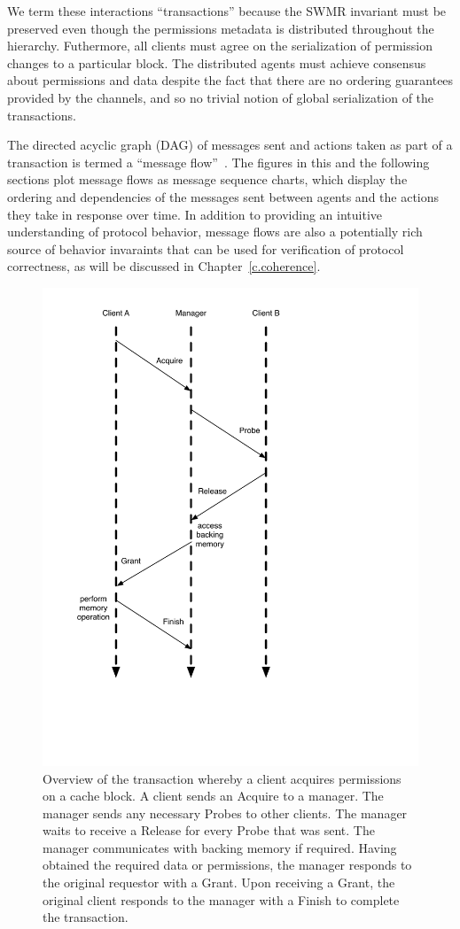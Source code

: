 We term these interactions ``transactions'' because the SWMR invariant must be preserved even though the permissions metadata is distributed throughout the hierarchy.
Futhermore, all clients must agree on the serialization of permission changes to a particular block.
The distributed agents must achieve consensus about permissions and data despite the fact that there are no ordering guarantees
provided by the channels, and so no trivial notion of global serialization of the transactions.

The directed acyclic graph (DAG) of messages sent and actions taken as part of a transaction is termed a ``message flow''~\cite{talupur2008going}.
The figures in this and the following sections plot message flows as message sequence charts,
which display the ordering and dependencies of the messages sent between agents and the actions they take in response over time.
In addition to providing an intuitive understanding of protocol behavior, message flows are also a potentially
rich source of behavior invaraints that can be used for verification of protocol correctness, as will be discussed in Chapter~\ref{c.coherence}.

\begin{figure}[t!]
\centering
\includegraphics[width=0.6\columnwidth]{tilelink/figures/standard3.pdf}
\caption{Overview of the transaction whereby a client acquires permissions on a cache block.
A client sends an Acquire to a manager.
The manager sends any necessary Probes to other clients.
The manager waits to receive a Release for every Probe that was sent.
The manager communicates with backing memory if required.
Having obtained the required data or permissions, the manager responds to the original requestor with a Grant.
Upon receiving a Grant, the original client responds to the manager with a Finish to complete the transaction.
}
\label{fig:standard3}
\end{figure}

